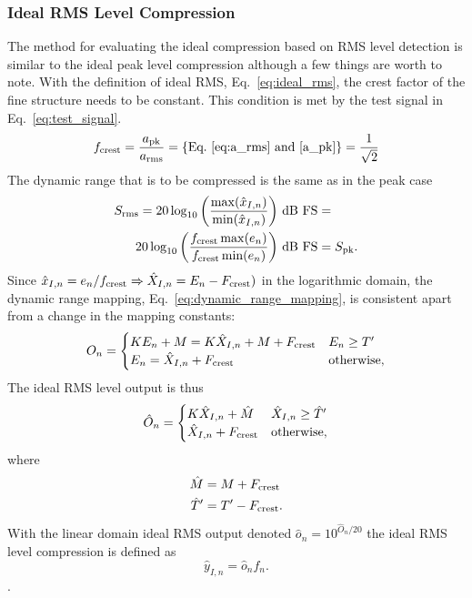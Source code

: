 \documentclass[../main2.tex]{subfiles}
\begin{document}
\FloatBarrier
\subsubsection{Ideal RMS Level Compression}\label{method_ideal_rms_compression}
The method for evaluating the ideal compression based on RMS level detection is similar to the ideal peak level compression although a few things are worth to note.
With the definition of ideal RMS, Eq.~\eqref{eq:ideal_rms}, the crest factor of the fine structure needs to be constant. This condition is met by the test signal in Eq.~\eqref{eq:test_signal}.
\begin{align}
f_\text{crest} = \frac{a_\text{pk}}{a_\text{rms}} = \left\{\text{Eq.~\eqref{eq:a_rms} and \eqref{a_pk}}\right\} = \frac{1}{\sqrt{2}}
\end{align}
The dynamic range that is to be compressed is the same as in the peak case
\begin{equation}
\begin{split}
S_\text{rms} = 20 \log_{10} \left(\frac{\max(\hat{x}_{I,n})}{\min(\hat{x}_{I,n})}\right) \mskip3mu\text{dB FS} &= \\ 
20 \log_{10} \left(\frac{f_\text{crest}\max(e_n)}{f_\text{crest}\min(e_n)}\right) \mskip3mu\text{dB FS} &= S_\text{pk}.
\end{split}
\end{equation}
Since $\hat{x}_{I,n} = e_n/f_\text{crest} \Rightarrow \hat{X}_{I,n} = E_n - F_\text{crest})$ in the logarithmic domain,  the dynamic range mapping, Eq.~\eqref{eq:dynamic_range_mapping}, is consistent apart from a change in the mapping constants: 
\begin{equation}
O_n =
\begin{cases}
	K E_n + M = K\hat{X}_{I,n} + M + F_\text{crest}	& E_n \geq T'  \\
	E_n = \hat{X}_{I,n} + F_\text{crest}				& \text{otherwise},
\end{cases} 
\end{equation}
The ideal RMS level output is thus
\begin{equation}
\hat{O}_n =
\begin{cases}
	K\hat{X}_{I,n} + \hat{M}	& \hat{X}_{I,n} \geq \hat{T}' \\
	\hat{X}_{I,n} + F_\text{crest}				& \text{otherwise},
\end{cases} 
\end{equation}
where
\begin{align}
\hat{M} &= M + F_\text{crest} \\
\hat{T}' &=T' - F_\text{crest}.
\end{align}
With the linear domain ideal RMS output denoted $\hat{o}_n = 10^{\hat{O}_n/20}$ the ideal RMS level compression is defined as
\begin{equation}\label{eq:ideal_rms_output}
\hat{y}_{I,n} = \hat{o}_n f_n.
\end{equation}.
\end{document}
